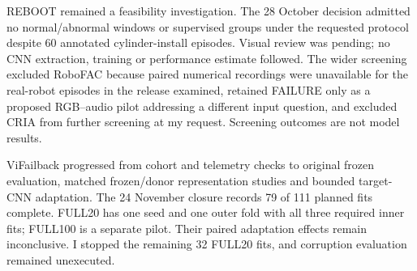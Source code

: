 REBOOT \parencite{OforiAmpofo2026REBOOT} remained a feasibility investigation. The
28 October decision admitted no
normal/abnormal windows or supervised groups under the requested protocol despite 60
annotated cylinder-install episodes. Visual review was pending; no CNN extraction,
training or performance estimate followed. The wider screening excluded RoboFAC
\parencite{Lu2025RoboFAC,RoboFACHF2025} because paired numerical recordings were
unavailable for the real-robot episodes in the release examined, retained FAILURE
\parencite{Inceoglu2021FINONet} only as a proposed RGB--audio pilot addressing a different
input question, and excluded CRIA \parencite{Qiao2026MAIA} from further screening at my request.
Screening outcomes are not model results.

ViFailback progressed from cohort and telemetry checks to original frozen evaluation,
matched frozen/donor representation studies and bounded target-CNN adaptation. The 24
November closure records 79 of 111 planned fits complete. FULL20 has one seed and one
outer fold with all three required inner fits; FULL100 is a separate pilot. Their paired
adaptation effects remain inconclusive. I stopped the remaining 32 FULL20
fits, and corruption evaluation remained unexecuted.

